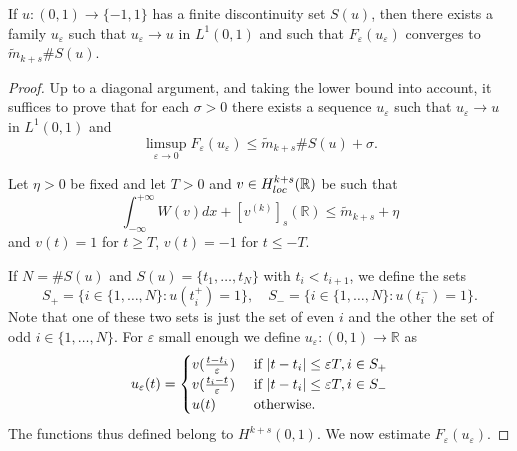 \documentclass[10pt,a4paper]{amsart}
\newcommand{\e}{\varepsilon}
\begin{document}
\begin{proposition}
If $u\colon(0,1)\to\{-1,1\}$ has a finite discontinuity set $S(u)$, then there exists a family $u_\e$ such that $u_\e\to u$ in $L^1(0,1)$ and such that $F_\e(u_\e)$ converges to $\widetilde m_{k+s}\#S(u)$.
\end{proposition}

\begin{proof}
Up to a diagonal argument, and taking the lower bound into account, it suffices to prove that for each $\sigma>0$ there exists a sequence $u_\e$ such that $u_\e\to u$ in $L^1(0,1)$ and 
\begin{equation}
\limsup_{\e\to 0}F_\e(u_\e)\le\widetilde m_{k+s}\#S(u)+\sigma.
\end{equation}

\smallskip
Let $\eta>0$ be fixed and let $T>0$ and $v\in H^{k+s}_{\rm loc} (\mathbb R)$ be such that 
$$
\int_{-\infty}^{+\infty} W(v)dx+[v^{(k)}]_{s}(\mathbb R)\le \widetilde m_{k+s}+\eta
$$
and $v(t)=1$ for $t\ge T$, $v(t)=-1$ for $t\le -T$.

If  $N=\#S(u)$ and $S(u)=\{t_1,\ldots, t_N\}$ with $t_i<t_{i+1}$, we define the sets
$$
S_+=\{i\in\{1,\ldots,N\}: u(t_i^+)=1\},\quad S_-=\{i\in\{1,\ldots,N\}: u(t_i^-)=1\}.
$$
Note that one of these two sets is just the set of even $i$ and the other the set of odd $i\in\{1,\ldots,N\}$.
For $\e$ small enough we define $u_\e\colon(0,1)\to \mathbb R$ as 
$$
u_\e(t)=\begin{cases}
v(\frac{t-t_i}\e) &\hbox{ if }|t-t_i|\le\e T, i\in S_+\\
v(\frac{t_i-t}\e) &\hbox{ if }|t-t_i|\le\e T, i\in S_-\\
u(t) &\hbox{ otherwise.}
\end{cases}
$$
The functions thus defined belong to $H^{k+s}(0,1)$. We now estimate $F_\e(u_\e)$.


\end{proof}
\end{document}
